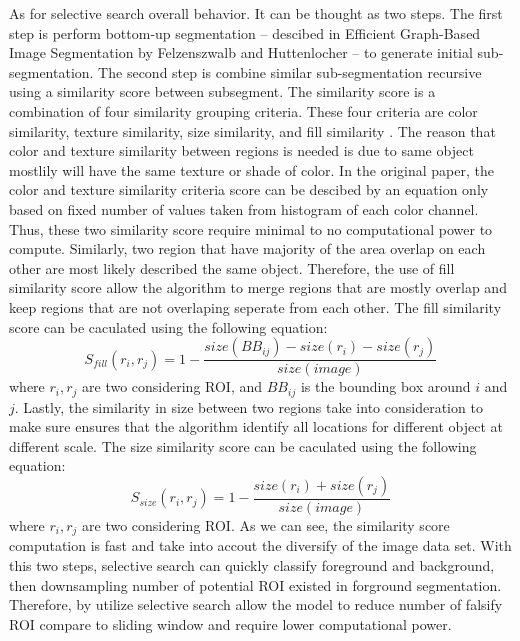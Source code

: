 As for selective search overall behavior. It can be thought as two steps. The first step is perform bottom-up segmentation -- descibed in Efficient Graph-Based Image Segmentation by Felzenszwalb and Huttenlocher \cite{felzenszwalb_huttenlocher_2004} -- to generate initial sub-segmentation. The second step is combine similar sub-segmentation recursive using a similarity score between subsegment. The similarity score is a combination of four similarity grouping criteria. These four criteria are color similarity, texture similarity, size similarity, and fill similarity \cite{selective_search_2013}. The reason that color and texture similarity between regions is needed is due to same object mostlily will have the same texture or shade of color. In the original paper, the color and texture similarity criteria score can be descibed by an equation only based on fixed number of values taken from histogram of each color channel. Thus, these two similarity score require minimal to no computational power to compute. Similarly, two region that have majority of the area overlap on each other are most likely described the same object. Therefore, the use of fill similarity score allow the algorithm to merge regions that are mostly overlap and keep regions that are not overlaping seperate from each other. The fill similarity score can be caculated using the following equation: 
%
\begin{equation*}
    S_{fill}(r_i, r_j) = 1-\frac{size(BB_{ij})-size(r_i)-size(r_j)}{size(image)}
\end{equation*}
%
where $r_i, r_j$ are two considering ROI, and $BB_{ij}$ is the bounding box around $i$ and $j$. Lastly, the similarity in size between two regions take into consideration to make sure ensures that the algorithm identify all locations for different object at different scale. The size similarity score can be caculated using the following equation: 
%
\begin{equation*}
    S_{size}(r_i, r_j) = 1-\frac{size(r_i)+size(r_j)}{size(image)}
\end{equation*}
%
where $r_i, r_j$ are two considering ROI. As we can see, the similarity score computation is fast and take into accout the diversify of the image data set. With this two steps, selective search can quickly classify foreground and background, then downsampling number of potential ROI existed in forground segmentation. Therefore, by utilize selective search allow the model to reduce number of falsify ROI compare to sliding window and require lower computational power.

